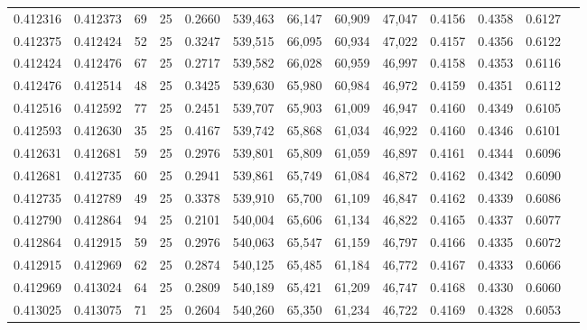 \begin{tabular}{rrrrrrrrrrrrr}
0.412316 & 0.412373 &    69 &  25 &                                     0.2660 & 539,463 &  66,147 &  60,909 &  47,047 & 0.4156 & 0.4358 & 0.6127 \\
0.412375 & 0.412424 &    52 &  25 &                                     0.3247 & 539,515 &  66,095 &  60,934 &  47,022 & 0.4157 & 0.4356 & 0.6122 \\
0.412424 & 0.412476 &    67 &  25 &                                     0.2717 & 539,582 &  66,028 &  60,959 &  46,997 & 0.4158 & 0.4353 & 0.6116 \\
0.412476 & 0.412514 &    48 &  25 &                                     0.3425 & 539,630 &  65,980 &  60,984 &  46,972 & 0.4159 & 0.4351 & 0.6112 \\
0.412516 & 0.412592 &    77 &  25 &                                     0.2451 & 539,707 &  65,903 &  61,009 &  46,947 & 0.4160 & 0.4349 & 0.6105 \\
0.412593 & 0.412630 &    35 &  25 &                                     0.4167 & 539,742 &  65,868 &  61,034 &  46,922 & 0.4160 & 0.4346 & 0.6101 \\
0.412631 & 0.412681 &    59 &  25 &                                     0.2976 & 539,801 &  65,809 &  61,059 &  46,897 & 0.4161 & 0.4344 & 0.6096 \\
0.412681 & 0.412735 &    60 &  25 &                                     0.2941 & 539,861 &  65,749 &  61,084 &  46,872 & 0.4162 & 0.4342 & 0.6090 \\
0.412735 & 0.412789 &    49 &  25 &                                     0.3378 & 539,910 &  65,700 &  61,109 &  46,847 & 0.4162 & 0.4339 & 0.6086 \\
0.412790 & 0.412864 &    94 &  25 &                                     0.2101 & 540,004 &  65,606 &  61,134 &  46,822 & 0.4165 & 0.4337 & 0.6077 \\
0.412864 & 0.412915 &    59 &  25 &                                     0.2976 & 540,063 &  65,547 &  61,159 &  46,797 & 0.4166 & 0.4335 & 0.6072 \\
0.412915 & 0.412969 &    62 &  25 &                                     0.2874 & 540,125 &  65,485 &  61,184 &  46,772 & 0.4167 & 0.4333 & 0.6066 \\
0.412969 & 0.413024 &    64 &  25 &                                     0.2809 & 540,189 &  65,421 &  61,209 &  46,747 & 0.4168 & 0.4330 & 0.6060 \\
0.413025 & 0.413075 &    71 &  25 &                                     0.2604 & 540,260 &  65,350 &  61,234 &  46,722 & 0.4169 & 0.4328 & 0.6053 \\

\end{tabular}
